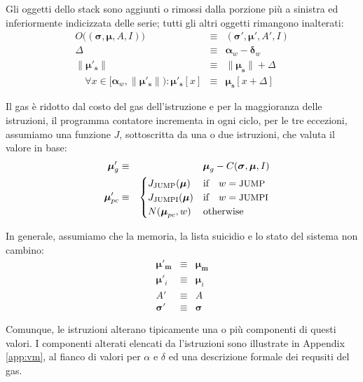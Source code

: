 \documentclass[9pt,oneside]{amsart}
\begin{document}
\begin{multicols}{2}
Gli oggetti dello stack sono aggiunti o rimossi dalla porzione più a sinistra ed inferiormente indicizzata delle serie; tutti gli altri oggetti rimangono inalterati:
\begin{eqnarray}
O\big((\boldsymbol{\sigma}, \boldsymbol{\mu}, A, I)\big) & \equiv & (\boldsymbol{\sigma}', \boldsymbol{\mu}', A', I) \\
\Delta & \equiv & \mathbf{\alpha}_w - \mathbf{\delta}_w \\
\lVert\boldsymbol{\mu}'_\mathbf{s}\rVert & \equiv & \lVert\boldsymbol{\mu}_\mathbf{s}\rVert + \Delta \\
\quad \forall x \in [\mathbf{\alpha}_w, \lVert\boldsymbol{\mu}'_\mathbf{s}\rVert): \boldsymbol{\mu}'_\mathbf{s}[x] & \equiv & \boldsymbol{\mu}_\mathbf{s}[x+\Delta]
\end{eqnarray}

Il gas è ridotto dal costo del gas dell'istruzione e per la maggioranza delle istruzioni, il programma contatore incrementa in ogni ciclo, per le tre eccezioni, assumiamo una funzione $J$, sottoscritta da una o due istruzioni, che valuta il valore in base:
\begin{eqnarray}
\quad \boldsymbol{\mu}'_{g} & \equiv & \boldsymbol{\mu}_{g} - C(\boldsymbol{\sigma}, \boldsymbol{\mu}, I) \\
\quad \boldsymbol{\mu}'_{pc} & \equiv & \begin{cases}
J_{\text{JUMP}}(\boldsymbol{\mu}) & \text{if} \quad w = \text{\small JUMP} \\
J_{\text{JUMPI}}(\boldsymbol{\mu}) & \text{if} \quad w = \text{\small JUMPI} \\
N(\boldsymbol{\mu}_{pc}, w) & \text{otherwise}
\end{cases}
\end{eqnarray}

In generale, assumiamo che la memoria, la lista suicidio e lo stato del sistema non cambino:
\begin{eqnarray}
\boldsymbol{\mu}'_\mathbf{m} & \equiv & \boldsymbol{\mu}_\mathbf{m} \\
\boldsymbol{\mu}'_i & \equiv & \boldsymbol{\mu}_i \\
A' & \equiv & A \\
\boldsymbol{\sigma}' & \equiv & \boldsymbol{\sigma}
\end{eqnarray}

Comunque, le istruzioni alterano tipicamente una o più componenti di questi valori. I componenti alterati elencati da l'istruzioni sono illustrate in Appendix \ref{app:vm}, al fianco di valori per $\alpha$ e $\delta$ ed una descrizione formale dei requsiti del gas.


\end{multicols}
\end{document}
